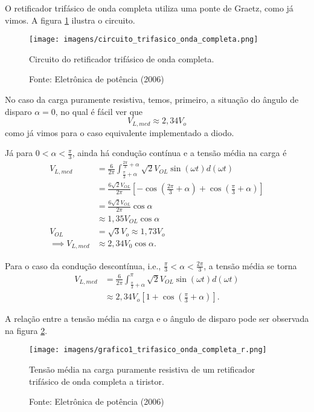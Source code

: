 O retificador trifásico de onda completa utiliza uma ponte de Graetz, como já vimos. A figura \ref{ctcl} ilustra o circuito.

\begin{figure}[h]
\center
\texttt{[image: imagens/circuito\_trifasico\_onda\_completa.png]}
\caption{Circuito do retificador trifásico de onda completa.} \label{ctcl} 
\caption*{Fonte: Eletrônica de potência (2006)}
\end{figure}

No caso da carga puramente resistiva, temos, primeiro, a situação do ângulo de disparo $\alpha = 0$, no qual é fácil ver que \[
V_{L,med} \approx 2,34 V_o
\] como já vimos para o caso equivalente implementado a diodo.

Já para $0<\alpha <\frac{\pi}{3}$, ainda há condução contínua e a tensão média na carga é 
\begin{align*}
    V_{L,med} &= \frac{6}{2\pi}\int_{\frac{\pi}{3}+\alpha}^{\frac{2\pi}{3}+\alpha}\sqrt{2}V_{OL}\sin(\omega{t})d(\omega{t})\\
	      &= \frac{6\sqrt{2}V_{OL}}{2\pi}\left[-\cos\left(\frac{2\pi}{3}+\alpha\right) + \cos\left(\frac{\pi}{3}+\alpha\right)\right] \\
    &= \frac{6\sqrt{2}V_{OL}}{2\pi}\cos\alpha\\
    &\approx 1,35V_{OL}\cos\alpha\\
    V_{OL} &= \sqrt{3}V_{o} \approx 1,73V_{o}\\
    \implies V_{L,med} &\approx 2,34V_{0}\cos\alpha
.\end{align*}

Para o caso da condução descontínua, i.e., $\frac{\pi}{3}<\alpha<\frac{2\pi}{3}$, a tensão média se torna
\begin{align*}
    V_{L,med} &= \frac{6}{2\pi}\int_{\frac{\pi}{3}+\alpha}^{\pi}\sqrt{2}V_{OL}\sin(\omega{t})d(\omega{t})\\
&\approx 2,34V_{o}\left[1 + \cos\left(\frac{\pi}{3}+\alpha \right)\right]
.\end{align*}

A relação entre a tensão média na carga e o ângulo de disparo pode ser observada na figura \ref{g1tcr}.

\begin{figure}[h]
\center
\texttt{[image: imagens/grafico1\_trifasico\_onda\_completa\_r.png]}
\caption{Tensão média na carga puramente resistiva de um retificador trifásico de onda completa a tiristor.} \label{g1tcr} 
\caption*{Fonte: Eletrônica de potência (2006)}
\end{figure}

